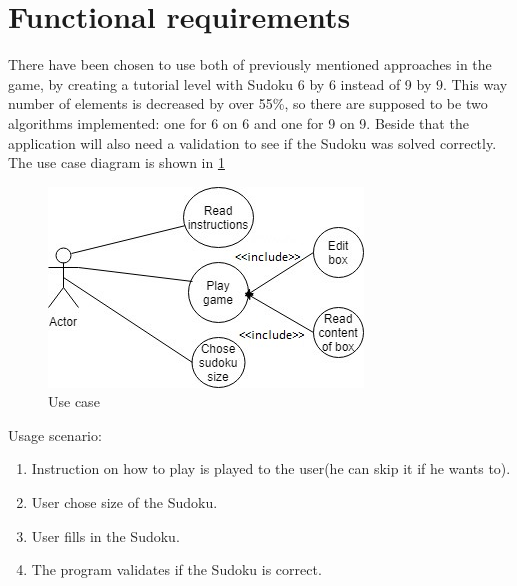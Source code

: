 \documentclass[a4paper,twoside,12pt]{book}
\begin{document}
\clearpage
\fi

\section{Functional requirements}
\par
There have been chosen to use both of previously mentioned approaches in the game, by creating a tutorial level with Sudoku 6 by 6 instead of 9 by 9. This way number of elements is decreased by over 55\%, so there are supposed to be two algorithms implemented: one for 6 on 6 and one for 9 on 9. Beside that the application will also need a validation to see if the Sudoku was solved correctly. The use case diagram is shown in \ref{fig:Use case}

\begin{figure}[!hb]
  \centering
  \includegraphics[width=.6\linewidth]{usecase2.jpg}
  \caption{Use case}
  \label{fig:Use case}
\end{figure}

\par
Usage scenario:
\begin{enumerate}
	\item Instruction on how to play is played to the user(he can skip it if he wants to).
	\item User chose size of the Sudoku.
	\item User fills in the Sudoku.
	\item The program validates if the Sudoku is correct.
\end{enumerate}
\end{document}
